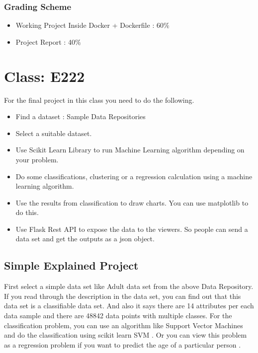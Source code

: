 \subsubsection{Grading Scheme}

\begin{itemize}
\item Working Project Inside Docker + Dockerfile : 60\%
\item Project Report : 40\%
\end{itemize}

\section{Class: E222}\label{s:classe22-proj}

For the final project in this class you need to do the following.

\begin{itemize}
\item Find a dataset : Sample Data Repositories
\item Select a suitable dataset.
\item Use Scikit Learn Library to run Machine Learning algorithm
  depending on your problem.
\item Do some classifications, clustering or a regression calculation
  using a machine learning algorithm.
\item Use the results from classification to draw charts. You can use
  matplotlib to do this.
\item Use Flask Rest API to expose the data to the viewers. So people
  can send a data set and get the outputs as a json object.
\end{itemize}


\subsection{Simple Explained Project}\label{s:e222-proj-exp}

First select a simple data set like Adult data set from the above Data
Repository. If you read through the description in the data set, you
can find out that this data set is a classifiable data set. And also
it says there are 14 attributes per each data sample and there are
48842 data points with multiple classes. For the classification
problem, you can use an algorithm like Support Vector Machines and do
the classification using scikit learn SVM
. Or you can view
this problem as a regression problem if you want to predict the age of
a particular person
.

